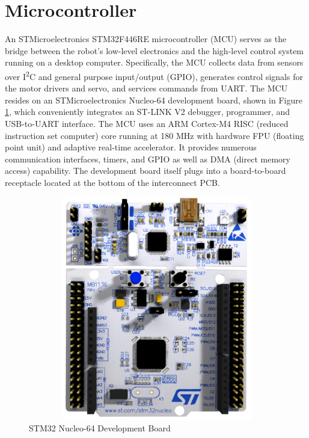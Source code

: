 \section{Microcontroller}
An STMicroelectronics STM32F446RE microcontroller (MCU) serves as the bridge between the robot's low-level electronics and the high-level control system running on a desktop computer. Specifically, the MCU collects data from sensors over I\textsuperscript{2}C and general purpose input/output (GPIO), generates control signals for the motor drivers and servo, and services commands from UART. The MCU resides on an STMicroelectronics Nucleo-64 development board, shown in Figure \ref{fig:nucleo64}, which conveniently integrates an ST-LINK V2 debugger, programmer, and USB-to-UART interface. The MCU uses an ARM Cortex-M4 RISC (reduced instruction set computer) core running at 180 MHz with hardware FPU (floating point unit) and adaptive real-time accelerator. It provides numerous communication interfaces, timers, and GPIO as well as DMA (direct memory access) capability. The development board itself plugs into a board-to-board receptacle located at the bottom of the interconnect PCB.
\begin{figure}[H]   %
	\centering \includegraphics[width=6in, height=3.85in, keepaspectratio]{figures/nucleo64.png}
	\caption{STM32 Nucleo-64 Development Board \cite{nucleo64_manual}}\label{fig:nucleo64}
\end{figure}

